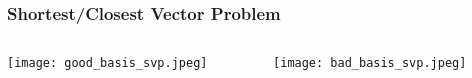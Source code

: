 \documentclass[
aspectratio=169, %
t, %
onlytextwidth, %
10pt, %
]{beamer}
\begin{document}

\begin{frame}
    \frametitle{Shortest/Closest Vector Problem}
    \begin{columns}[T] %
        \begin{column}{0.48\linewidth} %
            \texttt{[image: good\_basis\_svp.jpeg]} %
        \end{column}
        \begin{column}{0.48\linewidth} %
            \texttt{[image: bad\_basis\_svp.jpeg]} %
        \end{column}
    \end{columns}
\end{frame}

\end{document}
